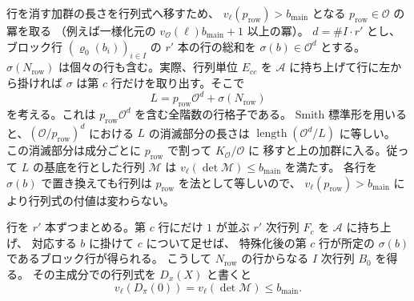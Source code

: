 行を消す加群の長さを行列式へ移すため、
\(v_\ell(p_{\mathrm{row}})>b_{\mathrm{main}}\) となる \(p_{\mathrm{row}}\in\mathcal O\) の冪を取る
（例えば一様化元の \(v_{\mathcal O}(\ell)b_{\mathrm{main}}+1\) 以上の冪）。
\(d=\#I\cdot r'\) とし、ブロック行 \((\varrho_0(b_i))_{i\in I}\)
の \(r'\) 本の行の総和を \(\sigma(b)\in\mathcal O^d\) とする。
\(\sigma(N_\mathrm{row})\) は個々の行も含む。実際、行列単位
\(E_{cc}\) を \(\mathcal A\) に持ち上げて行に左から掛ければ
\(\sigma\) は第 \(c\) 行だけを取り出す。そこで
\[
 L=p_{\mathrm{row}}\mathcal O^d+\sigma(N_\mathrm{row})
\]
を考える。これは \(p_{\mathrm{row}}\mathcal O^d\) を含む全階数の行格子である。
Smith 標準形を用いると、\((\mathcal O/p_{\mathrm{row}})^d\) における
\(L\) の消滅部分の長さは \(\operatorname{length}(\mathcal O^d/L)\) に等しい。
この消滅部分は成分ごとに \(p_{\mathrm{row}}\) で割って \(K_{\mathcal O}/\mathcal O\) に
移すと上の加群に入る。従って \(L\) の基底を行とした行列 \(\mathcal M\) は
\(v_\ell(\det\mathcal M)\le b_{\mathrm{main}}\) を満たす。
各行を \(\sigma(b)\) で置き換えても行列は \(p_{\mathrm{row}}\) を法として等しいので、
\(v_\ell(p_{\mathrm{row}})>b_{\mathrm{main}}\) により行列式の付値は変わらない。

行を \(r'\) 本ずつまとめる。第 \(c\) 行にだけ \(1\) が並ぶ
\(r'\) 次行列 \(F_c\) を \(\mathcal A\) に持ち上げ、
対応する \(b\) に掛けて \(c\) について足せば、
特殊化後の第 \(c\) 行が所定の \(\sigma(b)\) であるブロック行が得られる。
こうして \(N_\mathrm{row}\) の行からなる \(I\) 次行列 \(B_0\) を得る。
その主成分での行列式を \(D_x(X)\) と書くと
\begingroup{}
\[
 v_\ell(D_\pi(0))=v_\ell(\det\mathcal M)\le b_{\mathrm{main}} .
\]
\endgroup
